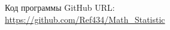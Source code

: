 \documentclass[../main.tex]{subfiles}
\begin{document}
    \noindent Код программы GitHub URL:\\
    \newline \url{https://github.com/Ref434/Math_Statistic}
\end{document}
